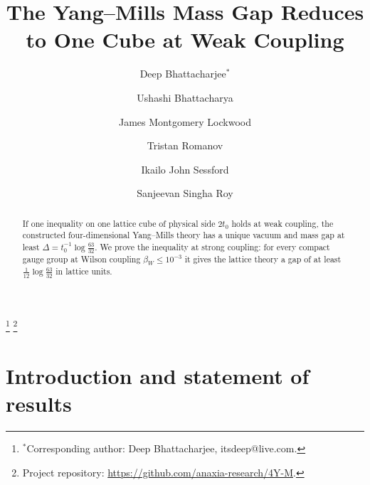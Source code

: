 \documentclass[11pt,a4paper]{amsart}
\theoremstyle{definition}
\theoremstyle{remark}
\numberwithin{equation}{section}
\begin{document}
\title[The mass gap reduces to one cube]{The Yang--Mills Mass Gap Reduces to One Cube at Weak Coupling}
\author[D. Bhattacharjee]{Deep Bhattacharjee$^*$}
\address{Formerly, Electro-Gravitational Space Propulsion Laboratory (EGSPL), Bhubaneswar, Odisha 751030, India; formerly, University of Calcutta (Heramba Chandra College), 23/49 Gariahat Road, Golpark, Kolkata 700029, West Bengal, India}
\thanks{$^*$Corresponding author: Deep Bhattacharjee, itsdeep@live.com.}
\thanks{Project repository: \url{https://github.com/anaxia-research/4Y-M}.}
\author[U. Bhattacharya]{Ushashi Bhattacharya}
\address{Formerly, National Taiwan University, Taipei 106319, Taiwan}
\author[J. M. Lockwood]{James Montgomery Lockwood}
\address{Independent Researcher, San Antonio, USA}
\author[T. Romanov]{Tristan Romanov}
\address{Independent Researcher, San Francisco, CA, USA}
\author[I. J. Sessford]{Ikailo John Sessford}
\address{Ikailo Inc., Whitby, Ontario, Canada}
\author[S. Singha Roy]{Sanjeevan Singha Roy}
\address{Department of Physics, Birla Institute of Technology, Mesra, Ranchi, Jharkhand 835215, India}
\begin{abstract}
If one inequality on one lattice cube of physical side $2t_0$ holds at weak coupling, the constructed four-dimensional Yang--Mills theory has a unique vacuum and mass gap at least $\Delta=t_0^{-1}\log\frac{63}{32}$. We prove the inequality at strong coupling: for every compact gauge group at Wilson coupling $\beta_W\le10^{-3}$ it gives the lattice theory a gap of at least $\frac1{12}\log\frac{63}{32}$ in lattice units.
\end{abstract}
\maketitle
{}

\section{Introduction and statement of results}\label{sec:intro}
\end{document}
